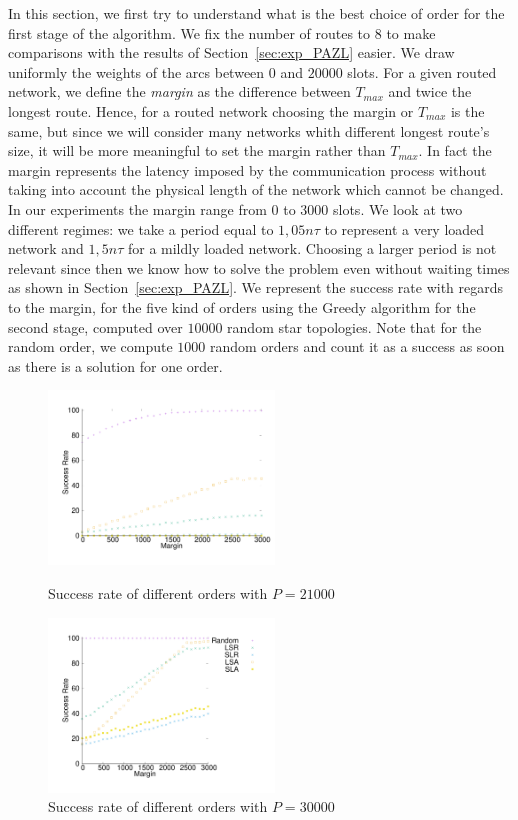 \documentclass[a4paper,10pt]{article}
\begin{document}
{    
    In this section, we first try to understand what is the best choice of order for the first stage of the algorithm.
    We fix the number of routes to $8$ to make comparisons with the results of Section~\ref{sec:exp_PAZL} easier. 
    We draw uniformly the weights of the arcs between $0$ and $20000$ slots.
    For a given routed network, we define the {\em margin} as the difference between $T_{max}$ and twice the longest route. 
    Hence, for a routed network choosing the margin or $T_{max}$ is the same, but since we will consider many networks 
    whith different longest route's size, it will be more meaningful to set the margin rather than $T_{max}$.
    In fact the margin represents the latency imposed by the communication process without taking into account the physical length of the network which cannot be changed. In our experiments the margin range from  $0$ to $3000$ slots.
   We look at two different regimes: we take a period equal to $1,05n\tau$ to represent a very loaded network
   and $1,5n\tau$ for a mildly loaded network. Choosing a larger period is not relevant since then we know how to solve the problem even without waiting times as shown in Section~\ref{sec:exp_PAZL}. We represent the success rate with regards to the margin, for the five kind of orders using the Greedy algorithm for the second stage, computed over $10000$ random star topologies. Note that for the random order, we compute $1000$ random orders and count it as a success as soon as there is a solution for one order. 
 
\begin{figure}[H] 
    \begin{minipage}[c]{6cm}
  \centering
      \includegraphics[width=6cm]{departs_gp_21000.pdf}

      \caption{Success rate of different orders with $P = 21000$}
      \end{minipage} \hfill
        \begin{minipage}[c]{6cm}
          \includegraphics[width=6cm]{departs_gp_30000.pdf}
      \caption{Success rate of different orders with $P = 30000$}


\end{minipage}
\end{figure}}
\end{document}
